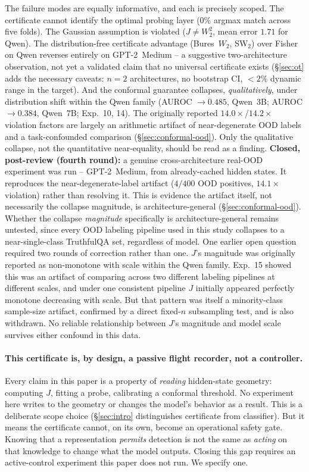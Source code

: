 \documentclass[10pt,twocolumn]{article}
\begin{document}
The failure modes are equally informative, and each is precisely
scoped. The certificate cannot identify the optimal probing layer (0\%
argmax match across five folds). The Gaussian assumption is violated
($J \neq W_2^2$, mean error $1.71$ for Qwen). The distribution-free
certificate advantage (Bures~$W_2$, SW$_2$) over Fisher on Qwen
reverses entirely on GPT-2~Medium -- a suggestive two-architecture
observation, not yet a validated claim that no universal certificate
exists (\S\ref{sec:ot} adds the necessary caveats: $n=2$ architectures,
no bootstrap CI, $<2\%$ dynamic range in the target). And the conformal
guarantee collapses, \emph{qualitatively}, under distribution shift
within the Qwen family (AUROC $\to 0.485$, Qwen~3B; AUROC $\to 0.384$,
Qwen~7B; Exp.~10, 14). The originally reported
$14.0\times$/$14.2\times$ violation factors are largely an arithmetic
artifact of near-degenerate OOD labels and a task-confounded comparison
(\S\ref{sec:conformal-ood}). Only the qualitative collapse, not the
quantitative near-equality, should be read as a finding. \textbf{Closed,
post-review (fourth round):} a genuine cross-architecture real-OOD
experiment was run -- GPT-2~Medium, from already-cached hidden states.
It reproduces the near-degenerate-label artifact ($4/400$ OOD
positives, $14.1\times$ violation) rather than resolving it. This is
evidence the artifact itself, not necessarily the collapse magnitude,
is architecture-general (\S\ref{sec:conformal-ood}). Whether the
collapse \emph{magnitude} specifically is architecture-general remains
untested, since every OOD labeling pipeline used in this study
collapses to a near-single-class TruthfulQA set, regardless of model.
One earlier open question required two rounds of correction rather
than one. $J$'s magnitude was originally reported as non-monotone with
scale within the Qwen family. Exp.~15 showed this was an artifact of
comparing across two different labeling pipelines at different scales,
and under one consistent pipeline $J$ initially appeared perfectly
monotone decreasing with scale. But that pattern was itself a
minority-class sample-size artifact, confirmed by a direct fixed-$n$
subsampling test, and is also withdrawn. No reliable relationship
between $J$'s magnitude and model scale survives either confound in
this data.

\paragraph{This certificate is, by design, a passive flight recorder,
not a controller.} Every claim in this paper is a property of
\emph{reading} hidden-state geometry: computing $J$, fitting a probe,
calibrating a conformal threshold. No experiment here writes to the
geometry or changes the model's behavior as a result. This is a
deliberate scope choice (\S\ref{sec:intro} distinguishes certificate
from classifier). But it means the certificate cannot, on its own,
become an operational safety gate. Knowing that a representation
\emph{permits} detection is not the same as \emph{acting} on that
knowledge to change what the model outputs. Closing this gap requires
an active-control experiment this paper does not run. We specify one.
\end{document}
